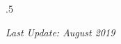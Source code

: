 \documentclass[margin]{res}
\begin{document}
\begin{resume}
\begin{itemize}
\end{itemize}


\moveleft.5\hoffset\centerline{\textit{Last Update: August 2019}}

\end{resume}
\end{document}
